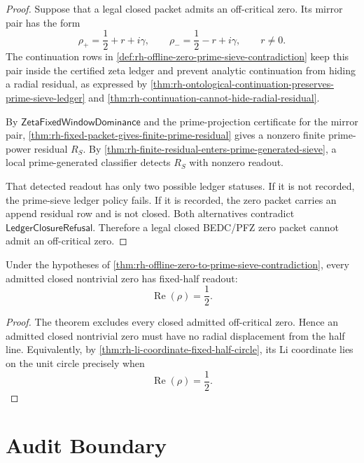\begin{proof}
Suppose that a legal closed packet admits an off-critical zero.  Its
mirror pair has the form
$$
\rho_+=\frac12+r+i\gamma,
\qquad
\rho_-=\frac12-r+i\gamma,
\qquad
r\ne0.
$$
The continuation rows in
\autoref{def:rh-offline-zero-prime-sieve-contradiction} keep this pair
inside the certified zeta ledger and prevent analytic continuation
from hiding a radial residual, as expressed by
\autoref{thm:rh-ontological-continuation-preserves-prime-sieve-ledger}
and \autoref{thm:rh-continuation-cannot-hide-radial-residual}.

By $\mathsf{ZetaFixedWindowDominance}$ and the prime-projection
certificate for the mirror pair,
\autoref{thm:rh-fixed-packet-gives-finite-prime-residual} gives a
nonzero finite prime-power residual $R_S$.  By
\autoref{thm:rh-finite-residual-enters-prime-generated-sieve}, a local
prime-generated classifier detects $R_S$ with nonzero readout.

That detected readout has only two possible ledger statuses.  If it is
not recorded, the prime-sieve ledger policy fails.  If it is recorded,
the zero packet carries an append residual row and is not closed.  Both
alternatives contradict $\mathsf{LedgerClosureRefusal}$.  Therefore a
legal closed BEDC/PFZ zero packet cannot admit an off-critical zero.
\end{proof}

\begin{corollary}
\label{cor:rh-offline-zero-prime-sieve-conditional-fixed-half-readout}
Under the hypotheses of
\autoref{thm:rh-offline-zero-to-prime-sieve-contradiction}, every
admitted closed nontrivial zero has fixed-half readout:
$$
\operatorname{Re}(\rho)=\frac12.
$$
\end{corollary}

\begin{proof}
The theorem excludes every closed admitted off-critical zero.  Hence an
admitted closed nontrivial zero must have no radial displacement from
the half line.  Equivalently, by
\autoref{thm:rh-li-coordinate-fixed-half-circle}, its Li coordinate lies
on the unit circle precisely when
$$
\operatorname{Re}(\rho)=\frac12.
$$
\end{proof}

\section{Audit Boundary}
\label{sec:rh-offline-zero-prime-sieve-audit-boundary}

